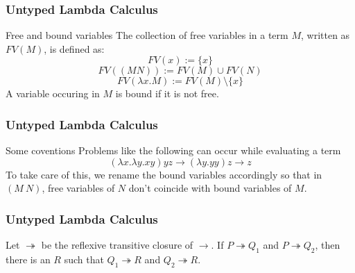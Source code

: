 \documentclass[14pt,compress]{beamer}
\begin{document}
\begin{frame}\label{frame : free and bound variables}
\frametitle{Untyped Lambda Calculus}
\begin{block}{Free and bound variables}
The collection of free variables in a term $M$, written as $FV(M)$, is defined as:
\textcolor{beamer@mathtext}{
\[ FV(x) := \{x\} \]
\[ FV((M N)) := FV(M)\cup FV(N) \]
\[ FV(\lambda x.M) := FV(M)\setminus \{x\} \]}
\pause
A variable occuring in $M$ is bound if it is not free.
\end{block}


\end{frame}

\begin{frame}\label{frame : variable capture}
\frametitle{Untyped Lambda Calculus}

\begin{block}{Some coventions}
Problems like the following can occur while evaluating a term
\textcolor{beamer@mathtext}{
\[ (\lambda x.\lambda y.x y) y z \to (\lambda y.y y) z \to z \]}
\pause
To take care of this, we rename the bound variables accordingly so that in $(M\ N)$,
free variables of $N$ don't coincide with bound variables of $M$.
\end{block}

\end{frame}
\begin{frame}[fragile]\label{frame : Church Rosser Theorem}
\frametitle{Untyped Lambda Calculus}

\begin{theorem}
Let $\twoheadrightarrow$ be the reflexive transitive closure of $\to$.
If $P \twoheadrightarrow Q_1$ and $P \twoheadrightarrow Q_2$,
then there is an $R$ such that $Q_1 \twoheadrightarrow R$ and $Q_2 \twoheadrightarrow R$.
\end{theorem}
\color{beamer@mathtext}{
\begin{equation*}
\begin{tikzcd}
& P \arrow[rd,twoheadrightarrow] \arrow[ld,twoheadrightarrow] & \\
Q_1 \arrow[rd,dashed,twoheadrightarrow] & & Q_2 \arrow[ld,dashed,twoheadrightarrow] \\
& R &
\end{tikzcd}
\end{equation*}}
\end{frame}
\end{document}
